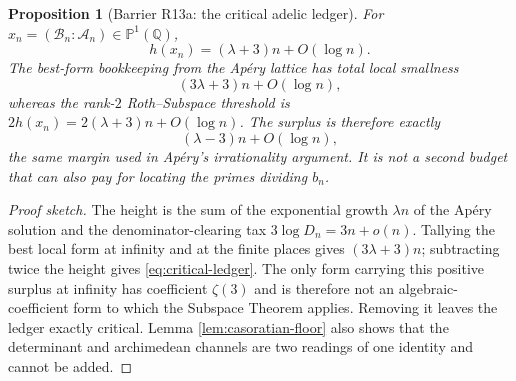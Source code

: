 \documentclass[11pt]{amsart}
\theoremstyle{plain}
\newtheorem{proposition}{Proposition}
\theoremstyle{remark}
\begin{document}
\begin{proposition}[Barrier R13a: the critical adelic ledger]
\label{prop:critical-ledger}
For $x_n=(\mathcal B_n:\mathcal A_n)\in\mathbb P^1(\mathbb Q)$,
\[
 h(x_n)=(\lambda+3)n+O(\log n).
\]
The best-form bookkeeping from the Ap\'ery lattice has total local
smallness
\[
 (3\lambda+3)n+O(\log n),
\]
whereas the rank-$2$ Roth--Subspace threshold is
$2h(x_n)=2(\lambda+3)n+O(\log n)$.  The surplus is therefore exactly
\[
 (\lambda-3)n+O(\log n),
 \tag{8.16}\label{eq:critical-ledger}
\]
the same margin used in Ap\'ery's irrationality argument.  It is not a
second budget that can also pay for locating the primes dividing
$b_n$.
\end{proposition}

\begin{proof}[Proof sketch]
The height is the sum of the exponential growth $\lambda n$ of the
Ap\'ery solution and the denominator-clearing tax
$3\log D_n=3n+o(n)$.  Tallying the best local form at infinity and at
the finite places gives $(3\lambda+3)n$; subtracting twice the height
gives \eqref{eq:critical-ledger}.  The only form carrying this positive
surplus at infinity has coefficient $\zeta(3)$ and is therefore not an
algebraic-coefficient form to which the Subspace Theorem applies.
Removing it leaves the ledger exactly critical.  Lemma
\ref{lem:casoratian-floor} also shows that the determinant and
archimedean channels are two readings of one identity and cannot be
added.
\end{proof}
\end{document}

